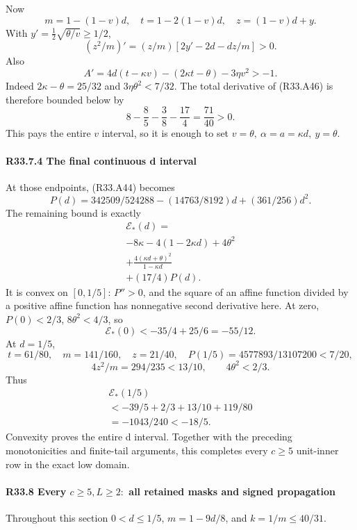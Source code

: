 Now
\[
m=1-(1-v)d,\quad t=1-2(1-v)d,\quad z=(1-v)d+y.
\]
With \(y'=\frac12\sqrt{\theta/v}\ge1/2\),
\[
(z^2/m)'=(z/m)[2y'-2d-dz/m]>0.
\]
Also
\[
A'=4d(t-\kappa v)-(2\kappa t-\theta)-3\eta v^2>-1.
\]
Indeed \(2\kappa-\theta=25/32\) and
\(3\eta\theta^2<7/32\). The total derivative of (R33.A46) is therefore
bounded below by
\[
8-\frac85-\frac38-\frac{17}{4}=\frac{71}{40}>0.
\]
This pays the entire \(v\) interval, so it is enough to set
\(v=\theta,\allowbreak \allowbreak  \ \alpha=a=\kappa d,\allowbreak \allowbreak  \ y=\theta\).

\paragraph{R33.7.4 The final continuous d interval}

At those endpoints, (R33.A44) becomes
\[
P(d)=342509/524288-(14763/8192)d+(361/256)d^2.
\]
The remaining bound is exactly
\[
\begin{gathered}
\mathcal E_*(d)=\\
-8\kappa-4(1-2\kappa d)+4\theta^2\\
+\frac{4(\kappa d+\theta)^2}{1-\kappa d}\\
+(17/4)P(d).
\end{gathered}\tag{R33.A47}
\]
It is convex on \([0,\allowbreak \allowbreak  1/5]\): \(P''>0\), and the square of an affine
function divided by a positive affine function has nonnegative
second derivative here.
At zero, \(P(0)<2/3\), \(8\theta^2<4/3\), so
\[
\mathcal E_*(0)<-35/4+25/6=-55/12.
\]
At \(d=1/5\),
\[
t=61/80,\quad m=141/160,\quad z=21/40,\quad
P(1/5)=4577893/13107200<7/20,
\]
\[
4z^2/m=294/235<13/10,\qquad4\theta^2<2/3.
\]
Thus
\[
\begin{gathered}
\mathcal E_*(1/5)\\
<-39/5+2/3+13/10+119/80\\
=-1043/240<-18/5.
\end{gathered}\tag{R33.A48}
\]
Convexity proves the entire d interval. Together with the preceding
monotonicities and finite-tail arguments, this completes every
\(c\ge 5\) unit-inner row in the exact low domain.

\paragraph{R33.8 Every \(c\ge 5,\allowbreak  L\ge 2:\) all retained masks and signed propagation}

Throughout this section \(0<d\le1/5\), \(m=1-9d/8\), and
\(k=1/m\le40/31\).

